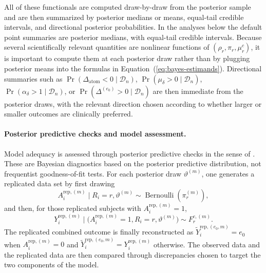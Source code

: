 \documentclass[11pt]{article}
\DeclareMathOperator*{\Bernoulli}{Bernoulli}
\begin{document}
All of these functionals are computed draw-by-draw from the posterior sample and are then summarized by posterior medians or means, equal-tail credible intervals, and directional posterior probabilities. In the analyses below the default point summaries are posterior medians, with equal-tail credible intervals. Because several scientifically relevant quantities are nonlinear functions of $(\rho_r,\pi_r,\mu_r^c)$, it is important to compute them at each posterior draw rather than by plugging posterior means into the formulas in Equation~(\ref{eq:bayes-estimands}). Directional summaries such as $\Pr(\Delta_{\mathrm{atom}} < 0 \mid \mathcal{D}_n)$, $\Pr(\mu_{\delta} > 0 \mid \mathcal{D}_n)$, $\Pr(\alpha_{\delta} > 1 \mid \mathcal{D}_n)$, or $\Pr(\Delta^{(e_0)} > 0 \mid \mathcal{D}_n)$ are then immediate from the posterior draws, with the relevant direction chosen according to whether larger or smaller outcomes are clinically preferred.

\paragraph{Posterior predictive checks and model assessment.}
Model adequacy is assessed through posterior predictive checks in the sense of \citet{gelman1996posterior}. These are Bayesian diagnostics based on the posterior predictive distribution, not frequentist goodness-of-fit tests. For each posterior draw $\vartheta^{(m)}$, one generates a replicated data set by first drawing
\[
  A_i^{\mathrm{rep},(m)} \mid R_i = r, \vartheta^{(m)} \sim \Bernoulli\!\left(\pi_r^{(m)}\right),
\]
and then, for those replicated subjects with $A_i^{\mathrm{rep},(m)} = 1$,
\[
  Y_i^{\mathrm{rep},(m)} \mid \bigl(A_i^{\mathrm{rep},(m)} = 1, R_i = r, \vartheta^{(m)}\bigr)
  \sim F_r^{c,(m)}.
\]
The replicated combined outcome is finally reconstructed as $\widetilde{Y}_i^{\mathrm{rep},(e_0,m)} = e_0$ when $A_i^{\mathrm{rep},(m)} = 0$ and $\widetilde{Y}_i^{\mathrm{rep},(e_0,m)} = Y_i^{\mathrm{rep},(m)}$ otherwise. The observed data and the replicated data are then compared through discrepancies chosen to target the two components of the model.
\end{document}
